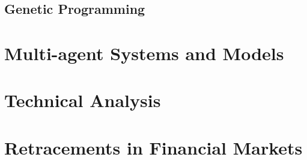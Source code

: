\subsection{Genetic Programming}
\label{subsection:genetic-programming}

\section{Multi-agent Systems and Models}
\label{section:multi-agent-systems-and-models}

\section{Technical Analysis}
\label{section:technical-analysis}

\section{Retracements in Financial Markets}
\label{section:retracements-in-financial-markets}

